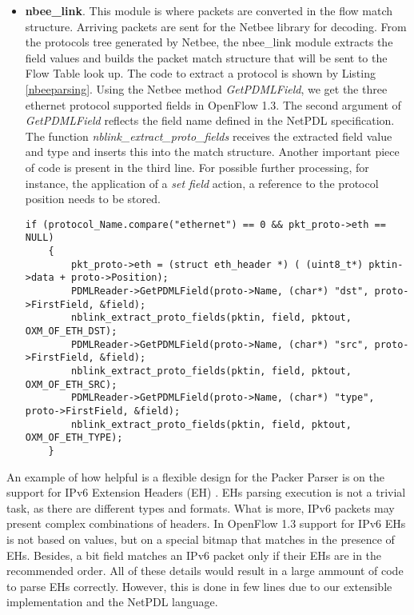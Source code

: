 \begin{itemize}
    \item \textbf{nbee_link}. This module is where packets are converted in the flow match structure. Arriving packets are sent for the Netbee library for decoding. From the protocols tree generated by Netbee, the nbee_link module   
extracts the field values and builds the packet match structure that will be sent to the Flow Table look up. The code to extract a protocol is shown by Listing \ref{nbeeparsing}. Using the Netbee method \textit{GetPDMLField}, we get the three ethernet protocol supported fields in OpenFlow 1.3. The second argument of \textit{GetPDMLField} reflects the field name defined in the NetPDL specification. The function \textit{nblink_extract_proto_fields} receives the extracted field value and type and inserts this into the match structure. Another important piece of code is present in the third line. For possible further processing, for instance, the application of a \textit{set field} action, a reference to the protocol position needs to be stored. 
    \\
    \begin{lstlisting}[caption={Ethernet parsing in the nbee_link module}, label=nbeeparsing,]
    if (protocol_Name.compare("ethernet") == 0 && pkt_proto->eth == NULL)
    {
        pkt_proto->eth = (struct eth_header *) ( (uint8_t*) pktin->data + proto->Position);
        PDMLReader->GetPDMLField(proto->Name, (char*) "dst", proto->FirstField, &field);
        nblink_extract_proto_fields(pktin, field, pktout, OXM_OF_ETH_DST);
        PDMLReader->GetPDMLField(proto->Name, (char*) "src", proto->FirstField, &field);
        nblink_extract_proto_fields(pktin, field, pktout, OXM_OF_ETH_SRC);
        PDMLReader->GetPDMLField(proto->Name, (char*) "type", proto->FirstField, &field);
        nblink_extract_proto_fields(pktin, field, pktout, OXM_OF_ETH_TYPE);
    }
    \end{lstlisting}      
    
    \end{itemize}
    
    An example of how helpful is a flexible design for the Packer Parser is on the support for IPv6 Extension Headers (EH) \cite{rfc2460}. EHs parsing execution is not a trivial task, as there are different types and formats. What is more, IPv6 packets may present complex combinations of headers. In OpenFlow 1.3 support for IPv6 EHs is not based on values, but on a special bitmap that matches in the presence of EHs. Besides, a bit field matches an IPv6 packet only if their EHs are in the recommended order. All of these details would result in a large ammount of code to parse EHs correctly. However, this is done in few lines due to our extensible implementation and the NetPDL language.    

